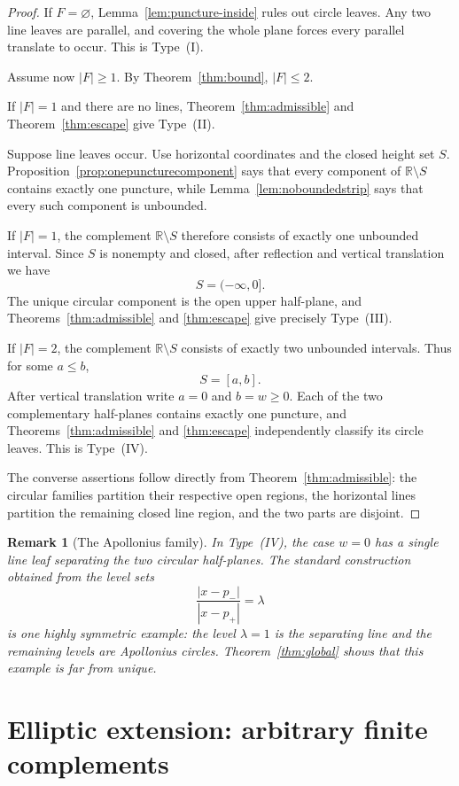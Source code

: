 \documentclass[11pt]{article}
\newtheorem{remark}[theorem]{Remark}
\newcommand{\R}{\mathbb{R}}
\begin{document}
\begin{proof}
If $F=\varnothing$, Lemma~\ref{lem:puncture-inside} rules out circle leaves. Any two line leaves are parallel, and covering the whole plane forces every parallel translate to occur. This is Type~(I).

Assume now $|F|\ge1$. By Theorem~\ref{thm:bound}, $|F|\le2$.

If $|F|=1$ and there are no lines, Theorem~\ref{thm:admissible} and Theorem~\ref{thm:escape} give Type~(II).

Suppose line leaves occur. Use horizontal coordinates and the closed height set $S$. Proposition~\ref{prop:onepuncturecomponent} says that every component of $\R\setminus S$ contains exactly one puncture, while Lemma~\ref{lem:noboundedstrip} says that every such component is unbounded.

If $|F|=1$, the complement $\R\setminus S$ therefore consists of exactly one unbounded interval. Since $S$ is nonempty and closed, after reflection and vertical translation we have
\[
S=(-\infty,0].
\]
The unique circular component is the open upper half-plane, and Theorems~\ref{thm:admissible} and \ref{thm:escape} give precisely Type~(III).

If $|F|=2$, the complement $\R\setminus S$ consists of exactly two unbounded intervals. Thus for some $a\le b$,
\[
S=[a,b].
\]
After vertical translation write $a=0$ and $b=w\ge0$. Each of the two complementary half-planes contains exactly one puncture, and Theorems~\ref{thm:admissible} and \ref{thm:escape} independently classify its circle leaves. This is Type~(IV).

The converse assertions follow directly from Theorem~\ref{thm:admissible}: the circular families partition their respective open regions, the horizontal lines partition the remaining closed line region, and the two parts are disjoint.
\end{proof}

\begin{remark}[The Apollonius family]\label{rem:apollonius}
In Type~(IV), the case $w=0$ has a single line leaf separating the two circular half-planes. The standard construction obtained from the level sets
\[
\frac{|x-p_-|}{|x-p_+|}=\lambda
\]
is one highly symmetric example: the level $\lambda=1$ is the separating line and the remaining levels are Apollonius circles. Theorem~\ref{thm:global} shows that this example is far from unique.
\end{remark}

\section{Elliptic extension: arbitrary finite complements}\label{sec:elliptic-extension}
\end{document}
